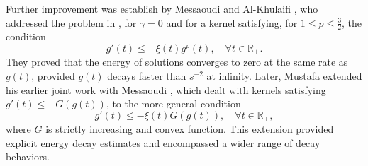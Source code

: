 \documentclass[reqno]{amsart}
\begin{document}
Further improvement was establish by Messaoudi and Al-Khulaifi \cite{MessaoudiWaled}, who addressed the problem in \cite{CavalcantiDS}, for $\gamma =0$ and for a kernel satisfying, for $1\leq p\leq \frac{3}{2}$, the condition
\[
g'(t) \leq -\xi(t) g^p(t), \quad \forall t \in \mathbb{R}_{+}.
\]
They proved that the energy of solutions converges to zero at the same rate as $g(t)$, provided $g(t)$ decays faster than $s^{-2}$ at infinity. Later, Mustafa \cite{MM181} extended his earlier joint work with Messaoudi \cite{MM}, which dealt with kernels satisfying $g'(t) \leq -G(g(t))$, to the more general condition $$g'(t) \leq -\xi(t) G(g(t)), \quad \forall t \in \mathbb{R}_{+},$$ where $G$ is strictly increasing and convex function. This extension provided explicit energy decay estimates and encompassed a wider range of decay behaviors.
\end{document}
